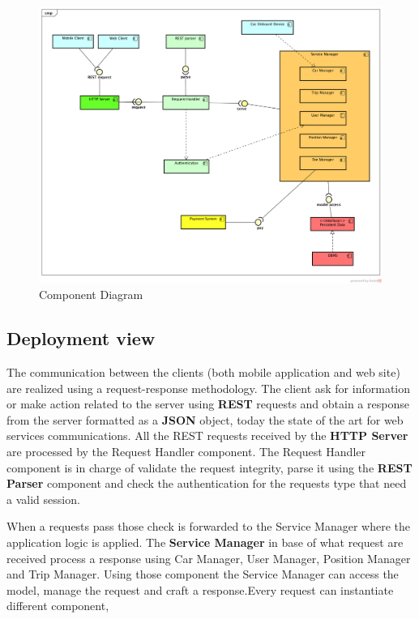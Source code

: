 \begin{figure}[H]	
	\centering
	\includegraphics[width=\textwidth]{img/backend_component_diagram}
	\caption{Component Diagram}
\end{figure}



\newpage

\subsection{Deployment view}


The communication between the clients (both mobile application and web site) are realized using a request-response methodology. The client ask for information or make action related to the server using \textbf{REST} requests and obtain a response from the server formatted as a \textbf{JSON} object, today the state of the art for web services communications.
All the REST requests received by the \textbf{HTTP Server} are processed by the Request Handler component. The Request Handler component is in charge of validate the request integrity, parse it using the \textbf{REST Parser }component and check the authentication for the requests type that need a valid session.



When a requests pass those check is forwarded to the Service Manager where the application logic is applied.
The \textbf{Service Manager} in base of what request are received process a response using Car Manager, User Manager, Position Manager and Trip Manager.
Using those component the Service Manager can access the model, manage the request and craft a response.Every request can instantiate different component,


